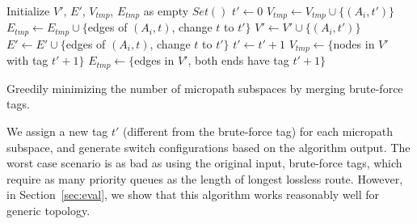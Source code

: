 \begin{algorithm}
	\small
	Initialize $V'$, $E'$, $V_{tmp}$, $E_{tmp}$ as empty $Set()$\;
	$t' \gets 0$\;
	 {
		 {
			$V_{tmp} \gets V_{tmp} \cup \{(A_i, t')\}$\;
			$E_{tmp} \gets E_{tmp} \cup \{$edges of $(A_i, t)$, change $t$ to $t'\}$\;
			 {
				$V' \gets V' \cup \{(A_i, t')\}$\;
				$E' \gets E' \cup \{$edges of $(A_i, t)$, change $t$ to $t'\}$\; 
			}
		}
		 {
			$t' \gets t'+1$\;
			$V_{tmp} \gets \{$nodes in $V'$ with tag $t'+1\}$\;
			$E_{tmp} \gets \{$edges in $V'$, both ends have tag $t'+1\}$\;
		}
	}
	\;
    \caption{Greedily minimizing the number of micropath subspaces by merging brute-force tags.}
	\label{alg:greedy}
\end{algorithm}

We assign a new tag $t'$ (different from the brute-force tag) for each micropath
subspace, and generate switch configurations based on the algorithm output. The
worst case scenario is as bad as using the original input, brute-force tags,
which require as many priority queues as the length of longest lossless route.
However, in Section~\ref{sec:eval}, we show that this algorithm works reasonably
well for generic topology.  
